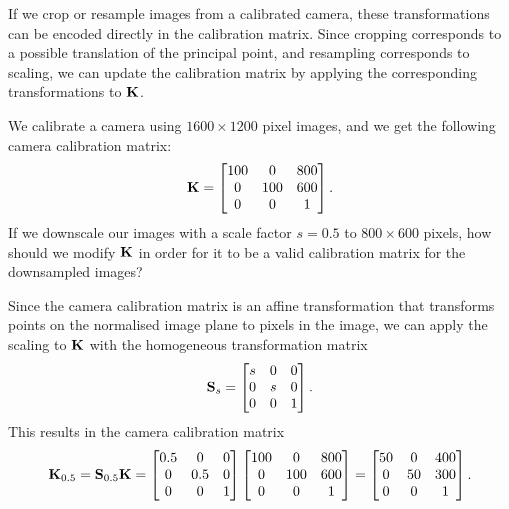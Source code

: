If we crop or resample images from a calibrated camera, these transformations can be encoded directly in the calibration matrix.
Since cropping corresponds to a possible translation of the principal point, and resampling corresponds to scaling, we can update the calibration matrix by applying the corresponding transformations to ${\boldsymbol{\mathbf{K}}}$.

\begin{example}[frametitle=Camera calibration matrix for downsampled images]
We calibrate a camera using $1600 \times 1200$ pixel images, and we get the following camera calibration matrix:
\begin{equation}
  {\boldsymbol{\mathbf{K}}} =
  \begin{bmatrix}
    100 &   0 & 800\\
      0 & 100 & 600\\
      0 &   0 &   1
  \end{bmatrix}.
\end{equation}
If we downscale our images with a scale factor $s = 0.5$ to $800 \times 600$ pixels, how should we modify ${\boldsymbol{\mathbf{K}}}$ in order for it to be a valid calibration matrix for the downsampled images?

Since the camera calibration matrix is an affine transformation that transforms points on the normalised image plane to pixels in the image, we can apply the scaling to ${\boldsymbol{\mathbf{K}}}$ with the homogeneous transformation matrix
\begin{equation}
    {\boldsymbol{\mathbf{S}}}_s = 
  \begin{bmatrix}
    s & 0 & 0\\
    0 & s & 0\\
    0 & 0 & 1
  \end{bmatrix}.
\end{equation}
This results in the camera calibration matrix
\begin{equation}
  {\boldsymbol{\mathbf{K}}}_{0.5} = {\boldsymbol{\mathbf{S}}}_{0.5} {\boldsymbol{\mathbf{K}}} = 
    \begin{bmatrix}
    0.5 & 0 & 0\\
    0 & 0.5 & 0\\
    0 & 0 & 1
  \end{bmatrix}
  \begin{bmatrix}
    100 &   0 & 800\\
      0 & 100 & 600\\
      0 &   0 &   1
  \end{bmatrix}
  =
  \begin{bmatrix}
    50 &   0 & 400\\
      0 & 50 & 300\\
      0 &   0 &   1
  \end{bmatrix}.
\end{equation}
\end{example}

